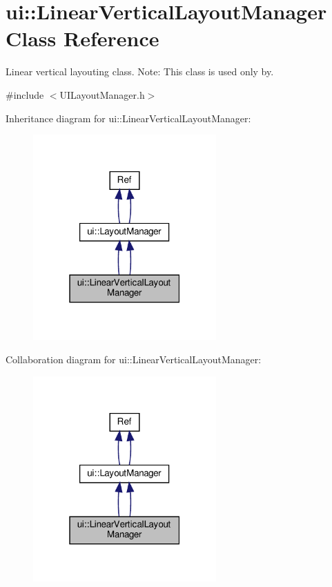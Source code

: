 \hypertarget{classui_1_1LinearVerticalLayoutManager}{}\section{ui\+:\+:Linear\+Vertical\+Layout\+Manager Class Reference}
\label{classui_1_1LinearVerticalLayoutManager}


Linear vertical layouting class. Note\+: This class is used only by.  




{\ttfamily \#include $<$U\+I\+Layout\+Manager.\+h$>$}



Inheritance diagram for ui\+:\+:Linear\+Vertical\+Layout\+Manager\+:
\nopagebreak
\begin{figure}[H]
\begin{center}
\leavevmode
\includegraphics[width=199pt]{classui_1_1LinearVerticalLayoutManager__inherit__graph}
\end{center}
\end{figure}


Collaboration diagram for ui\+:\+:Linear\+Vertical\+Layout\+Manager\+:
\nopagebreak
\begin{figure}[H]
\begin{center}
\leavevmode
\includegraphics[width=199pt]{classui_1_1LinearVerticalLayoutManager__coll__graph}
\end{center}
\end{figure}

